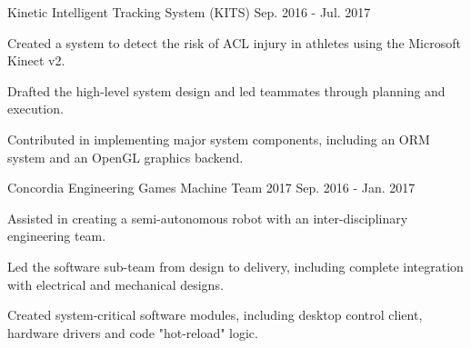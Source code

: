 

\begin{cventries}

  \vspace{1.5mm} %
  \cventry
    {Kinetic Intelligent Tracking System (KITS)} %
    {} %
    {} %
    {Sep. 2016 - Jul. 2017} %
    {
      \begin{cvitems} %
        \item {Created a system to detect the risk of ACL injury in athletes using the Microsoft Kinect v2.}
        \item {Drafted the high-level system design and led teammates through planning and execution.}
        \item {Contributed in implementing major system components, including an ORM system and an OpenGL graphics backend.}
        \\
      \end{cvitems}
    }

  \cventry
    {Concordia Engineering Games Machine Team 2017} %
    {} %
    {} %
    {Sep. 2016 - Jan. 2017} %
    {
      \begin{cvitems} %
        \item {Assisted in creating a semi-autonomous robot with an inter-disciplinary engineering team.}
        \item {Led the software sub-team from design to delivery, including complete integration with electrical and mechanical designs.}
        \item {Created system-critical software modules, including desktop control client, hardware drivers and code "hot-reload" logic.}
        \\
      \end{cvitems}
    }
    

\end{cventries}
